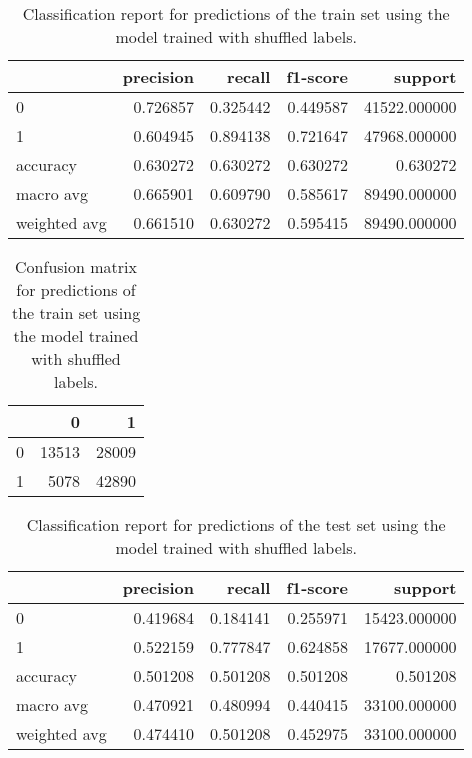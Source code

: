 \documentclass{article}
\begin{document}
\begin{itemize}
\begin{table}[h!]
\centering
\begin{tabular}{lrrrr}
\toprule
{} &  precision &    recall &  f1-score &       support \\
\midrule
0            &   0.726857 &  0.325442 &  0.449587 &  41522.000000 \\
1            &   0.604945 &  0.894138 &  0.721647 &  47968.000000 \\
accuracy     &   0.630272 &  0.630272 &  0.630272 &      0.630272 \\
macro avg    &   0.665901 &  0.609790 &  0.585617 &  89490.000000 \\
weighted avg &   0.661510 &  0.630272 &  0.595415 &  89490.000000 \\
\bottomrule
\end{tabular}
\caption{Classification report for predictions of the train set using the model trained with shuffled labels.}
\label{table:model1_tr_sh_cr}
\end{table}

\begin{table}[h!]
\centering
\begin{tabular}{lrr}
\toprule
{} &      0 &      1 \\
\midrule
0 &  13513 &  28009 \\
1 &   5078 &  42890 \\
\bottomrule
\end{tabular}

\caption{Confusion matrix for predictions of the train set using the model trained with shuffled labels.}
\label{table:model1_tr_sh_cm}
\end{table}

\begin{table}[h!]
\centering
\begin{tabular}{lrrrr}
\toprule
{} &  precision &    recall &  f1-score &       support \\
\midrule
0            &   0.419684 &  0.184141 &  0.255971 &  15423.000000 \\
1            &   0.522159 &  0.777847 &  0.624858 &  17677.000000 \\
accuracy     &   0.501208 &  0.501208 &  0.501208 &      0.501208 \\
macro avg    &   0.470921 &  0.480994 &  0.440415 &  33100.000000 \\
weighted avg &   0.474410 &  0.501208 &  0.452975 &  33100.000000 \\
\bottomrule
\end{tabular}
\caption{Classification report for predictions of the test set using the model trained with shuffled labels.}
\label{table:model1_te_sh_cr}
\end{table}
 

\end{itemize}
\end{document}
